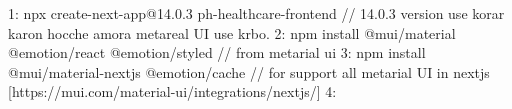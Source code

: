 1: npx create-next-app@14.0.3 ph-healthcare-frontend  // 14.0.3 version use korar karon hocche amora metareal UI use krbo.
2: npm install @mui/material @emotion/react @emotion/styled  // from metarial ui
3: npm install @mui/material-nextjs @emotion/cache // for support all metarial UI in nextjs [https://mui.com/material-ui/integrations/nextjs/]
4: 